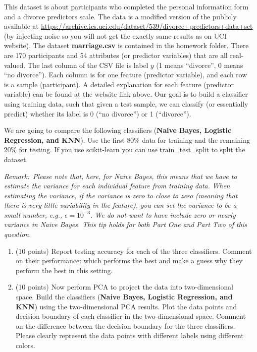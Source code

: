 \documentclass[12pt]{article}
\begin{document}
This dataset is about participants who completed the personal information form and a divorce predictors scale.  The data is a modified version of the publicly available at  \url{https://archive.ics.uci.edu/dataset/539/divorce+predictors+data+set} (by injecting noise so you will not get the exactly same results as on UCI website).  The dataset \textbf{marriage.csv} is contained in the homework folder. There are 170 participants and 54 attributes (or predictor variables) that are all real-valued. The last column of the CSV file is label $y$ (1 means ``divorce'', 0 means ``no divorce''). Each column is for one feature (predictor variable), and each row is a sample (participant). A detailed explanation for each feature (predictor variable) can be found at the website link above. Our goal is to build a classifier using training data, such that given a test sample, we can classify (or essentially predict) whether its label is 0 (``no divorce'') or 1 (``divorce''). 

We are going to compare the following classifiers  ({\bf Naive Bayes, Logistic Regression, and KNN}). Use the first $80\%$ data for training and the remaining $20\%$ for testing. If you use \textsf{scikit-learn} you can use \textsf{train\_test\_split} to split the dataset. 

\textit{Remark: Please note that, here, for Naive Bayes, this means that we have to estimate the variance for each individual feature from training data. When estimating the variance, if the variance is zero to close to zero (meaning that there is very little variability in the feature), you can set the variance to be a small number, e.g., $\epsilon = 10^{-3}$. We do not want to have include zero or nearly variance in Naive Bayes. This tip holds for both Part One and Part Two of this question.}


\begin{enumerate}

	\item (10 points) Report testing accuracy for each of the three classifiers.  Comment on their performance: which performs the best and make a guess why they perform the best in this setting. 
	\item (10 points) Now perform PCA to project the data into two-dimensional space. Build the classifiers  ({\bf Naive Bayes, Logistic Regression, and KNN}) using the two-dimensional PCA results. Plot the data points and decision boundary of each classifier in the two-dimensional space. Comment on the difference between the decision boundary for the three classifiers. Please clearly represent the data points with different labels using different colors.
	
\end{enumerate}
\end{document}

